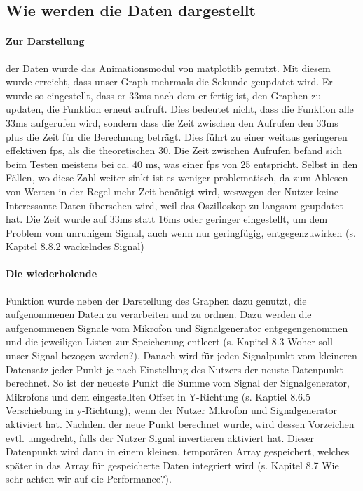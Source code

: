 \documentclass{article}
\begin{document}
\subsection{Wie werden die Daten dargestellt}
\paragraph{Zur Darstellung}
der Daten wurde das Animationsmodul von matplotlib genutzt. Mit diesem wurde erreicht, dass unser Graph mehrmals die Sekunde geupdatet wird. Er wurde so eingestellt, dass er 33ms nach dem er fertig ist, den Graphen zu updaten, die Funktion erneut aufruft. Dies bedeutet nicht, dass die Funktion alle 33ms aufgerufen wird, sondern dass die Zeit zwischen den Aufrufen den 33ms plus die Zeit für die Berechnung beträgt. Dies führt zu einer weitaus geringeren effektiven fps, als die theoretischen 30. Die Zeit zwischen Aufrufen befand sich beim Testen meistens bei ca. 40 ms, was einer fps von 25 entspricht. Selbst in den Fällen, wo diese Zahl weiter sinkt ist es weniger problematisch, da zum Ablesen von Werten in der Regel mehr Zeit benötigt wird, weswegen der Nutzer keine Interessante Daten übersehen wird, weil das Oszilloskop zu langsam geupdatet hat. Die Zeit wurde auf 33ms statt 16ms oder geringer eingestellt, um dem Problem vom unruhigem Signal, auch wenn nur geringfügig, entgegenzuwirken (s. Kapitel 8.8.2 wackelndes Signal)

\paragraph{Die wiederholende}
Funktion wurde neben der Darstellung des Graphen dazu genutzt, die aufgenommenen Daten zu verarbeiten und zu ordnen. Dazu werden die aufgenommenen Signale vom Mikrofon und Signalgenerator entgegengenommen und die jeweiligen Listen zur Speicherung entleert (s. Kapitel 8.3 Woher soll unser Signal bezogen werden?). Danach wird für jeden Signalpunkt vom kleineren Datensatz jeder Punkt je nach Einstellung des Nutzers der neuste Datenpunkt berechnet. So ist der neueste Punkt die Summe vom Signal der Signalgenerator, Mikrofons und dem eingestellten Offset in Y-Richtung (s. Kaptiel 8.6.5 Verschiebung in y-Richtung), wenn der Nutzer Mikrofon und Signalgenerator aktiviert hat.
Nachdem der neue Punkt berechnet wurde, wird dessen Vorzeichen evtl. umgedreht, falls der Nutzer Signal invertieren aktiviert hat. Dieser Datenpunkt wird dann in einem kleinen, temporären Array gespeichert, welches später in das Array für gespeicherte Daten integriert wird (s. Kapitel 8.7 Wie sehr achten wir auf die Performance?).
\end{document}
